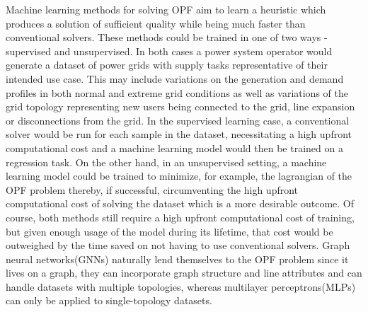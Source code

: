 Machine learning methods for solving OPF aim to learn a heuristic which produces
a solution of sufficient quality while being much faster than conventional solvers.
These methods could be trained in one of two ways - supervised and unsupervised.
In both cases a power system operator would generate a dataset of power grids with
supply tasks representative of their intended use case.
This may include variations on the generation and demand profiles in both normal
and extreme grid conditions as well as variations of the grid topology representing
new users being connected to the grid, line expansion or disconnections from the
grid.
In the supervised learning case, a conventional solver would be run for each sample
in the dataset, necessitating a high upfront computational cost and a machine
learning model would then be trained on a regression task.
On the other hand, in an unsupervised setting, a machine learning model could be
trained to minimize, for example, the lagrangian of the OPF problem thereby,
if successful, circumventing the high upfront computational cost of solving the
dataset which is a more desirable outcome.
Of course, both methods still require a high upfront computational cost of
training, but given enough usage of the model during its lifetime, that cost
would be outweighed by the time saved on not having to use conventional solvers.
Graph neural networks(GNNs) naturally lend themselves to the OPF problem since it
lives on a graph, they can incorporate graph structure and line attributes and can
handle datasets with multiple topologies, whereas multilayer perceptrons(MLPs)
can only be applied to single-topology datasets.
